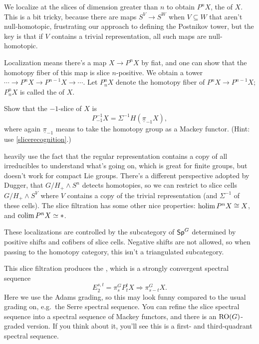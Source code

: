 We localize at the slices of dimension greater than $n$ to obtain $P^nX$, the
 of $X$. This is a bit tricky, because there are maps
$S^V\to S^W$ when $V\subseteq W$ that aren't null-homotopic, frustrating our approach to defining the Postnikov
tower, but the key is that if $V$ contains a trivial representation, all such maps are
null-homotopic.

Localization means there's a map $X\to P^nX$ by fiat, and one can show that the homotopy fiber of this map is slice
$n$-positive. We obtain a tower $\dotsb\to P^nX\to P^{n-1}X\to \dotsb$. Let $P_n^nX$ denote the homotopy fiber of
$P^nX\to P^{n-1}X$; $P_n^nX$ is called the  of $X$.
\begin{ex}
Show that the $-1$-slice of $X$ is
\[P_{-1}^{-1}X = \Sigma^{-1} H(\underline\pi_{-1}X),\]
where again $\underline\pi_{-1}$ means to take the homotopy group as a Mackey functor. (Hint: use
\cref{slicerecognition}.)
\end{ex}
\cite{HHR} heavily use the fact that the regular
representation contains a copy of all irreducibles to understand what's going on, which is great for finite groups,
but doesn't work for compact Lie groups. There's a different perspective adopted by Dugger, that $G/H_+\wedge S^n$
detects homotopies, so we can restrict to slice cells $G/H_+\wedge S^V$ where $V$ contains a copy of the trivial
representation (and $\Sigma^{-1}$ of these cells). The slice filtration has some other nice properties: $\operatorname*{holim}
P^nX\cong X$, and $\operatorname*{colim} P^nX\simeq *$.

These localizations are controlled by the subcategory of $\mathsf{Sp}^G$ determined by positive shifts and cofibers of
slice cells. Negative shifts are not allowed, so when passing to the homotopy category, this isn't a triangulated
subcategory.

This slice filtration produces the , which is a strongly convergent spectral sequence
\begin{equation}
\label{SlSS}
E_2^{s,t} = \pi_s^G P_t^tX\Longrightarrow \pi_{s-t}^G X.
\end{equation}
Here we use the Adams grading, so this may look funny compared to the usual grading on, e.g.\ the Serre spectral
sequence. You can refine the slice spectral sequence into a spectral sequence of Mackey functors, and there is an
$\mathrm{RO}(G)$-graded version. If you think about it, you'll see this is a first- and third-quadrant spectral
sequence.

